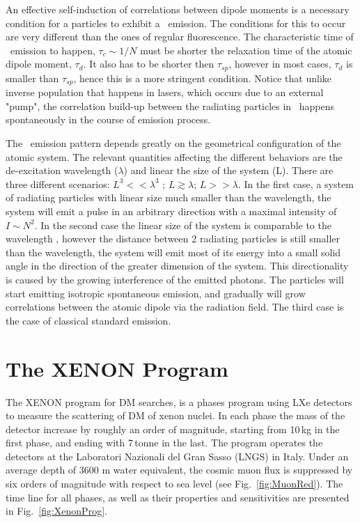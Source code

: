 An effective self-induction of correlations between dipole moments is a necessary condition for a particles to exhibit a \superradiance\ emission. The conditions for this to occur are very different than the ones of regular fluorescence. The characteristic time of \superradiance\ emission to happen, $\tau_c \sim 1/N $ must be shorter the relaxation time of the atomic dipole moment, $\tau_d$. It also has to be shorter then $\tau_{sp}$, however in most cases, $\tau_{d}$ is smaller than $\tau_{sp}$, hence this is a more stringent condition. Notice that unlike inverse population that happens in lasers, which occurs due to an external "pump", the correlation build-up between the radiating particles in \superradiance\ happens spontaneously in the course of emission process.

The \superradiance\ emission pattern depends greatly on the geometrical configuration of the atomic system. The relevant quantities affecting the  different behaviors are the de-excitation wavelength ($\lambda$) and linear the size of the system (L). There are three different scenarios: $L^3<<\lambda^3$ ; $L \gtrsim \lambda$; $L>>\lambda$. In the first case, a system of radiating particles with linear size much smaller than the wavelength, the system will emit a pulse in an arbitrary direction with a maximal intensity of $I \sim N^2$. In the second case the linear size of the system is comparable to the wavelength , however the distance between 2 radiating particles is still smaller than the wavelength, the system will emit most of its energy into a small solid angle in the direction of the greater dimension of the system. This directionality is caused by the growing interference of the emitted photons. The particles will start emitting isotropic spontaneous emission, and gradually will grow correlations between the atomic dipole via the radiation field. The third case is the case of classical standard emission. 
        








\section{The XENON Program}
\label{sec:xenonProg}

The XENON program for DM searches, is a phases program using LXe detectors to measure the scattering of DM of xenon nuclei. In each phase the mass of the detector increase by roughly an order of magnitude, starting from 10\,kg in the first phase, and ending with 7\,tonne in the last. The program operates the detectors at the Laboratori Nazionali del Gran Sasso (LNGS) in Italy. Under an average depth of 3600 m water equivalent, the cosmic muon
flux is suppressed by six orders of magnitude with respect to sea level (see Fig.~\ref{fig:MuonRed}). The time line for all phases, as well as their properties and sensitivities are presented in Fig.~\ref{fig:XenonProg}.

